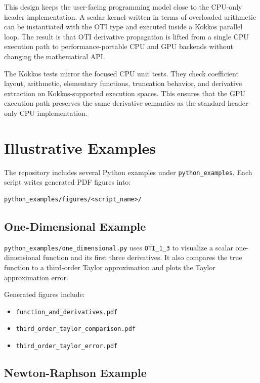 \documentclass[11pt]{article}
\begin{document}
This design keeps the user-facing programming model close to the CPU-only
header implementation. A scalar kernel written in terms of overloaded
arithmetic can be instantiated with the OTI type and executed inside a Kokkos
parallel loop. The result is that OTI derivative propagation is lifted from a
single CPU execution path to performance-portable CPU and GPU backends without
changing the mathematical API.

The Kokkos tests mirror the focused CPU unit tests. They check coefficient
layout, arithmetic, elementary functions, truncation behavior, and derivative
extraction on Kokkos-supported execution spaces. This ensures that the GPU
execution path preserves the same derivative semantics as the standard
header-only CPU implementation.

\section{Illustrative Examples}

The repository includes several Python examples under \texttt{python\_examples}.
Each script writes generated PDF figures into:

\begin{lstlisting}[style=shellstyle]
python_examples/figures/<script_name>/
\end{lstlisting}

\subsection{One-Dimensional Example}

\texttt{python\_examples/one\_dimensional.py} uses \texttt{OTI\_1\_3} to
visualize a scalar one-dimensional function and its first three derivatives.
It also compares the true function to a third-order Taylor approximation and
plots the Taylor approximation error.

Generated figures include:

\begin{itemize}[noitemsep]
    \item \texttt{function\_and\_derivatives.pdf}
    \item \texttt{third\_order\_taylor\_comparison.pdf}
    \item \texttt{third\_order\_taylor\_error.pdf}
\end{itemize}

\subsection{Newton-Raphson Example}
\end{document}
